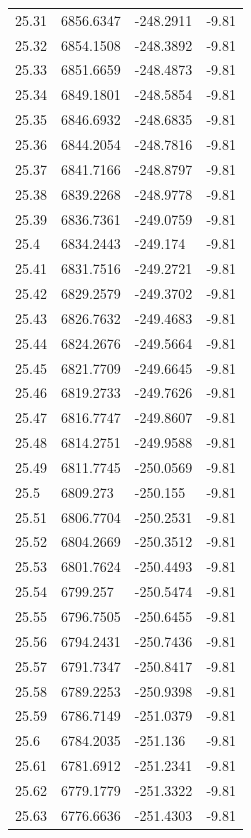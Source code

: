 \begin{table}[H]
\begin{tabular}{llll}
25.31 & 6856.6347 & -248.2911 & -9.81 \\
25.32 & 6854.1508 & -248.3892 & -9.81 \\
25.33 & 6851.6659 & -248.4873 & -9.81 \\
25.34 & 6849.1801 & -248.5854 & -9.81 \\
25.35 & 6846.6932 & -248.6835 & -9.81 \\
25.36 & 6844.2054 & -248.7816 & -9.81 \\
25.37 & 6841.7166 & -248.8797 & -9.81 \\
25.38 & 6839.2268 & -248.9778 & -9.81 \\
25.39 & 6836.7361 & -249.0759 & -9.81 \\
25.4 & 6834.2443 & -249.174 & -9.81 \\
25.41 & 6831.7516 & -249.2721 & -9.81 \\
25.42 & 6829.2579 & -249.3702 & -9.81 \\
25.43 & 6826.7632 & -249.4683 & -9.81 \\
25.44 & 6824.2676 & -249.5664 & -9.81 \\
25.45 & 6821.7709 & -249.6645 & -9.81 \\
25.46 & 6819.2733 & -249.7626 & -9.81 \\
25.47 & 6816.7747 & -249.8607 & -9.81 \\
25.48 & 6814.2751 & -249.9588 & -9.81 \\
25.49 & 6811.7745 & -250.0569 & -9.81 \\
25.5 & 6809.273 & -250.155 & -9.81 \\
25.51 & 6806.7704 & -250.2531 & -9.81 \\
25.52 & 6804.2669 & -250.3512 & -9.81 \\
25.53 & 6801.7624 & -250.4493 & -9.81 \\
25.54 & 6799.257 & -250.5474 & -9.81 \\
25.55 & 6796.7505 & -250.6455 & -9.81 \\
25.56 & 6794.2431 & -250.7436 & -9.81 \\
25.57 & 6791.7347 & -250.8417 & -9.81 \\
25.58 & 6789.2253 & -250.9398 & -9.81 \\
25.59 & 6786.7149 & -251.0379 & -9.81 \\
25.6 & 6784.2035 & -251.136 & -9.81 \\
25.61 & 6781.6912 & -251.2341 & -9.81 \\
25.62 & 6779.1779 & -251.3322 & -9.81 \\
25.63 & 6776.6636 & -251.4303 & -9.81 \\

\end{tabular}
\end{table}
